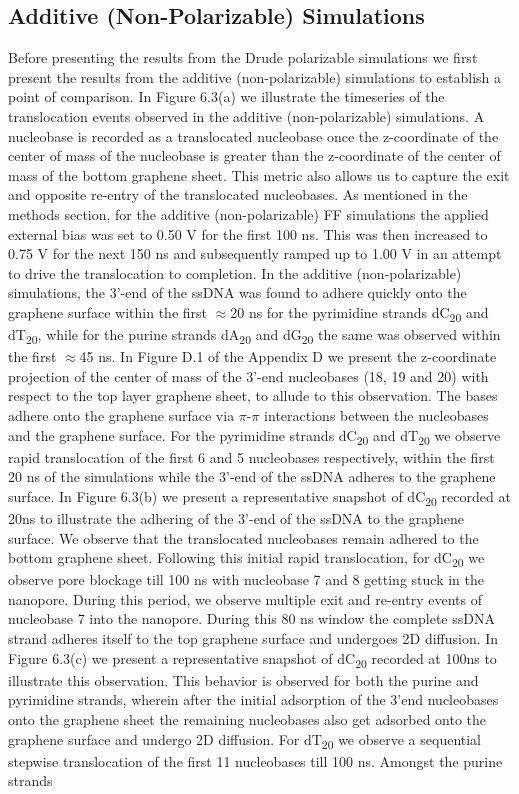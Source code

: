 \subsection[Additive (Non-Polarizable) Simulations]{Additive (Non-Polarizable) Simulations}
Before presenting the results from the Drude polarizable simulations we first present the results from the additive (non-polarizable) simulations to establish a point of comparison. In Figure 6.3(a) we illustrate the timeseries of the translocation events observed in the additive (non-polarizable) simulations. A nucleobase is recorded as a translocated nucleobase once the z-coordinate of the center of mass of the nucleobase is greater than the z-coordinate of the center of mass of the bottom graphene sheet. This metric also allows us to capture the exit and opposite re-entry of the translocated nucleobases. As mentioned in the methods section, for the additive (non-polarizable) FF simulations the applied external bias was set to 0.50 V for the first 100 ns. This was then increased to 0.75 V for the next 150 ns and subsequently ramped up to 1.00 V in an attempt to drive the translocation to completion. In the additive (non-polarizable) simulations, the 3’-end of the ssDNA was found to adhere quickly onto the graphene surface within the first $\approx$20 ns for the pyrimidine strands dC\textsubscript{20} and dT\textsubscript{20}, while for the purine strands dA\textsubscript{20} and dG\textsubscript{20} the same was observed within the first $\approx$45 ns. In Figure D.1 of the Appendix D we present the z-coordinate projection of the center of mass of the 3’-end nucleobases (18, 19 and 20) with respect to the top layer graphene sheet, to allude to this observation. The bases adhere onto the graphene surface via $\pi$-$\pi$ interactions between the nucleobases and the graphene surface. For the pyrimidine strands dC\textsubscript{20} and dT\textsubscript{20} we observe rapid translocation of the first 6 and 5 nucleobases respectively, within the first 20 ns of the simulations while the 3’-end of the ssDNA adheres to the graphene surface. In Figure 6.3(b) we present a representative snapshot of dC\textsubscript{20} recorded at 20ns to illustrate the adhering of the 3’-end of the ssDNA to the graphene surface. We observe that the translocated nucleobases remain adhered to the bottom graphene sheet. Following this initial rapid translocation, for dC\textsubscript{20} we observe pore blockage till 100 ns with nucleobase 7 and 8 getting stuck in the nanopore. During this period, we observe multiple exit and re-entry events of nucleobase 7 into the nanopore. During this 80 ns window the complete ssDNA strand adheres itself to the top graphene surface and undergoes 2D diffusion. In Figure 6.3(c) we present a representative snapshot of dC\textsubscript{20} recorded at 100ns to illustrate this observation. This behavior is observed for both the purine and pyrimidine strands, wherein after the initial adsorption of the 3’end nucleobases onto the graphene sheet the remaining nucleobases also get adsorbed onto the graphene surface and undergo 2D diffusion. For dT\textsubscript{20} we observe a sequential stepwise translocation of the first 11 nucleobases till 100 ns. Amongst the purine strands 